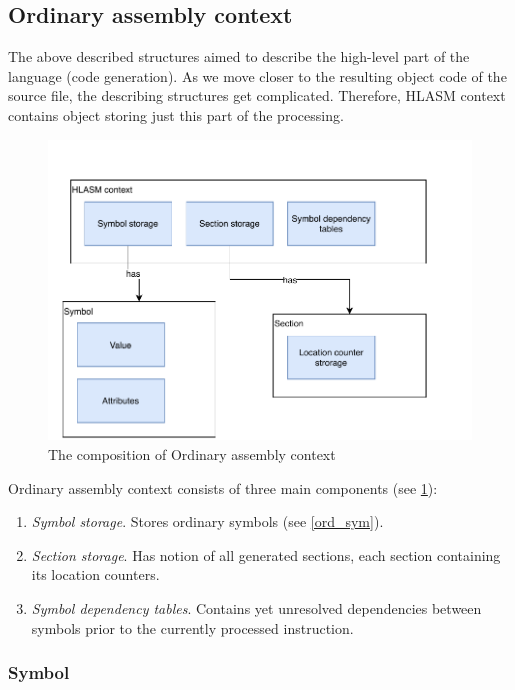\subsection{Ordinary assembly context}

The above described structures aimed to describe the high-level part of the language (code generation). As we move closer to the resulting object code of the source file, the describing structures get complicated. Therefore, HLASM context contains object storing just this part of the processing.

\begin{figure}
	\centering
	\includegraphics[width=\textwidth / 2]{img/ord_ctx_arch}
	\caption{The composition of Ordinary assembly context}
	\label{fig06:ord_ctx}
\end{figure}

Ordinary assembly context consists of three main components (see \cref{fig06:ord_ctx}):
\begin{enumerate}
	\item \emph{Symbol storage}. Stores ordinary symbols (see \cref{ord_sym}).
	\item \emph{Section storage}. Has notion of all generated sections, each section containing its location counters.
	\item \emph{Symbol dependency tables}. Contains yet unresolved dependencies between symbols prior to the currently processed instruction.
\end{enumerate}

\subsubsection{Symbol}

